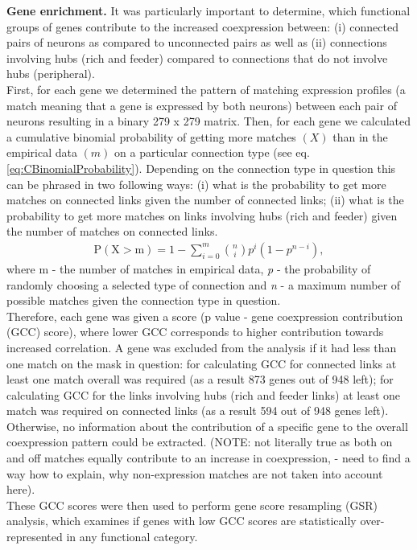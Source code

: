 \documentclass[10pt,letterpaper]{article}
\begin{document}
\textbf{Gene enrichment.}
It was particularly important to determine, which functional groups of genes contribute to the increased coexpression between: (i) connected pairs of neurons as compared to unconnected pairs as well as (ii) connections involving hubs (rich and feeder) compared to connections that do not involve hubs (peripheral). \\
First, for each gene we determined the pattern of matching expression profiles (a match meaning that a gene is expressed by both neurons) between each pair of neurons resulting in a binary 279 x 279 matrix.
Then, for each gene we calculated a cumulative binomial probability of getting more matches $(X)$ than in the empirical data $(m)$ on a particular connection type (see eq. \ref{eq:CBinomialProbability}). 
Depending on the connection type in question this can be phrased in two following ways: (i) what is the probability to get more matches on connected links given the number of connected links; (ii) what is the probability to get more matches on links involving hubs (rich and feeder) given the number of matches on connected links. 
\begin{eqnarray}
	\label{eq:CBinomialProbability}
     \mathrm{P(X>m)} = 1 - \sum_{\textit{i}=0}^{m}\binom{n}{i} p^{\textit{i}}(1-p^{n-\textit{i}}), 
\end{eqnarray}
where m - the number of matches in empirical data, \textit{p} - the probability of randomly choosing a selected type of connection and \textit{n} - a maximum number of possible matches given the connection type in question. \\
Therefore, each gene was given a score (p value - gene coexpression contribution (GCC) score), where lower GCC corresponds to higher contribution towards increased correlation. 
A gene was excluded from the analysis if it had less than one match on the mask in question: for calculating GCC for connected links at least one match overall was required (as a result 873 genes out of 948 left); for calculating GCC for the links involving hubs (rich and feeder links) at least one match was required on connected links (as a result 594 out of 948 genes left).    
Otherwise, no information about the contribution of a specific gene to the overall coexpression pattern could be extracted. 
(NOTE: not literally true as both on and off matches equally contribute to an increase in coexpression, - need to find a way how to explain, why non-expression matches are not taken into account here). \\
These GCC scores were then used to perform gene score resampling (GSR) analysis, which examines if genes with low GCC scores are statistically over-represented in any functional category. 
\end{document}
